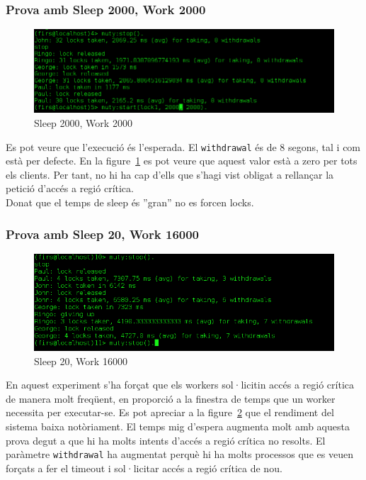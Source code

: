 \documentclass[a4paper, 11pt]{article}
\begin{document}
\subsubsection{Prova amb Sleep 2000, Work 2000}

\begin{figure}[H]
	\centering
    \includegraphics[width=1.0\textwidth]{figures/2000-2000lock1}
    \caption{Sleep 2000, Work 2000 \label{fig:2000-2000lock1}}    
\end{figure}


Es pot veure que l'execució és l'esperada. El \texttt{withdrawal} és de 8 segons, tal i com està per defecte. En la figure~\ref{fig:2000-2000lock1} es pot veure que aquest valor està a zero per tots els clients. Per tant, no hi ha cap d'ells que s'hagi vist obligat a rellançar la petició d'accés a regió crítica. \\ 
Donat que el temps de sleep és ''gran'' no es forcen locks. 

\subsubsection{Prova amb Sleep 20, Work 16000}

\begin{figure}[H]
	\centering
    \includegraphics[width=1.0\textwidth]{figures/20-16000lock1}
    \caption{Sleep 20, Work 16000 \label{fig:20-16000lock1}}    
\end{figure}

En aquest experiment s'ha forçat que els workers sol·licitin accés a regió crítica de manera molt freqüent, en proporció a la finestra de temps que un worker necessita per executar-se.  
Es pot apreciar a la figure~\ref{fig:20-16000lock1} que el rendiment del sistema baixa notòriament. El temps mig d'espera augmenta molt amb aquesta prova degut a que hi ha molts intents d'accés a regió crítica no resolts. El paràmetre \texttt{withdrawal} ha augmentat perquè hi ha molts processos que es veuen forçats a fer el timeout i sol·licitar accés a regió crítica de nou.
\end{document}
